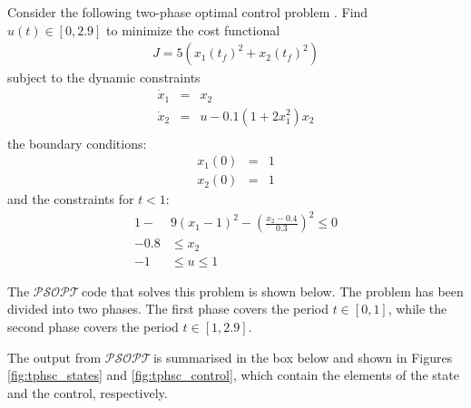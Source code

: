 \documentclass[a4paper,11pt]{report}    %
\newcommand{\psopt}{$\mathcal{PSOPT}$\,}  %
\newenvironment{shadedframe}{%
  \def\FrameCommand{\fcolorbox{black}{shadecolor}}%
  \MakeFramed {\FrameRestore}}
{\endMakeFramed}
\begin{document}
Consider the following two-phase optimal control problem  \cite{Rutquist:09}.  Find $u(t) \in [0, 2.9]$ 
to minimize the cost functional
\begin{equation}
\begin{aligned}
  J = 5 ( x_1(t_f)^2 + x_2(t_f)^2 )
\end{aligned}
\end{equation}
subject to the dynamic constraints
\begin{equation}
  \begin{array}{lcl}
   \dot x_1 &=& x_2 \\
   \dot x_2 &=& u-0.1(1+2 x_1^2) x_2 \\
  \end{array}
\end{equation}
the boundary conditions:
 \begin{equation}
  \begin{array}{cccccc}
   x_1(0) &=& 1   \\
   x_2(0) &=& 1   
  \end{array}
\end{equation}
and the constraints for $t<1$:
 \begin{equation}
  \begin{aligned}
   1 - &9(x_1-1)^2 - \left( \frac{x_2-0.4}{0.3} \right)^2 \le 0   \\
   -0.8 &\le x_2  \\
   -1 &\le u \le 1
  \end{aligned}
\end{equation}


The
\psopt code that solves this problem is shown below. The problem has been divided into two phases. The first phase covers
the period $t \in [0,1]$, while the second phase covers the period $t \in [1,2.9]$.

\tiny
\begin{shadedframe}

\end{shadedframe}
\normalsize

The output from \psopt is summarised in the box below and shown in Figures \ref{fig:tphsc_states} and \ref{fig:tphsc_control}, which contain the elements
of the state and the control, respectively.

\begin{shadedframe}

\end{shadedframe}
\end{document}
